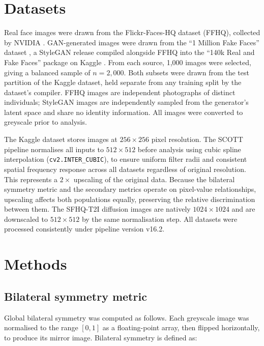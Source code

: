\documentclass[11pt,a4paper]{article}
\begin{document}
\section{Datasets}

Real face images were drawn from the Flickr-Faces-HQ dataset (FFHQ), collected
by NVIDIA \citep{karras2019style}. GAN-generated images were drawn from the ``1
Million Fake Faces'' dataset \citep{tunguz2020}, a StyleGAN release compiled
alongside FFHQ into the ``140k Real and Fake Faces'' package on Kaggle
\citep{xhlulu2020}. From each source, 1,000 images were selected, giving a
balanced sample of $n = 2{,}000$. Both subsets were drawn from the test
partition of the Kaggle dataset, held separate from any training split by the
dataset's compiler. FFHQ images are independent photographs of distinct
individuals; StyleGAN images are independently sampled from the generator's
latent space and share no identity information. All images were converted to
greyscale prior to analysis.

The Kaggle dataset stores images at $256 \times 256$ pixel resolution. The SCOTT
pipeline normalises all inputs to $512 \times 512$ before analysis using cubic
spline interpolation (\texttt{cv2.INTER\_CUBIC}), to ensure uniform filter radii
and consistent spatial frequency response across all datasets regardless of
original resolution. This represents a $2\times$ upscaling of the original data.
Because the bilateral symmetry metric and the secondary metrics operate on
pixel-value relationships, upscaling affects both populations equally,
preserving the relative discrimination between them. The SFHQ-T2I diffusion
images are natively $1024 \times 1024$ and are downscaled to $512 \times 512$
by the same normalisation step. All datasets were processed consistently under
pipeline version v16.2.

\section{Methods}

\subsection{Bilateral symmetry metric}

Global bilateral symmetry was computed as follows. Each greyscale image was
normalised to the range $[0, 1]$ as a floating-point array, then flipped
horizontally, to produce its mirror image. Bilateral symmetry is defined as:
\end{document}
